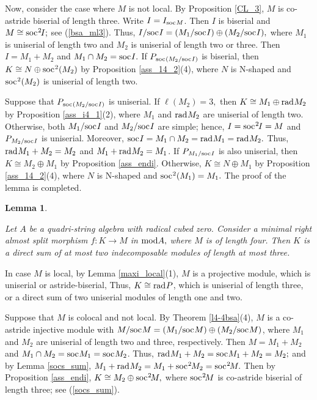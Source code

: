 \documentclass[10pt]{amsart}
\newtheorem{Lemma}[Theo]{Lemma}
\theoremstyle{definition}
\newcommand{\mmod}{{\rm mod}}
\newcommand{\rad}{{\rm rad}\hspace{.5pt}}
\newcommand{\soc}{{\rm soc}\hspace{.5pt}}
\newcommand{\hp}{\hspace{.5pt}}
\newcommand{\vp}{\vspace{.5pt}}
\begin{document}
Now, consider the case where $M$ is not local. By Proposition \ref{CL_3}, $M$ is co-astride biserial of length three. Write $I=I_{\soc M}$. Then $I$ is biserial and $M\cong \soc^2 \hspace{-1.2pt} I;$ see (\ref{bsa_ml3}). Thus, $I/ \soc I= (M_1/\soc I) \oplus (M_2/\soc I),$ where $M_1$ is uniserial of length two and $M_2$ is uniserial of length two or three. Then $I=M_1+M_2$ and $M_1\cap M_2=\soc I.$
If $P_{\hp \soc (M_2/\soc I)}$ is biserial, then
$K\cong N\oplus \soc^2(M_2)$ by Proposition \ref{ass_14_2}(4), where $N$ is N-shaped and $\soc^2(M_2)$ is uniserial of length two. 

Suppose that $P_{\hp \soc(M_2/\soc I)}$ is uniserial. If $\ell(M_2)=3,$ then $K\cong M_1 \oplus \rad  M_2$ by Proposition \ref{ass_i4_1}(2), where $M_1$ and $\rad M_2$ are uniserial of length two. Otherwise, both $M_1/\soc I$ and $M_2/\soc I$ are simple; hence, $I=\soc^2\hspace{-1pt}I=M$ and $P_{\hp M_2/\soc I}$ is uniserial. Moreover, $\soc I=M_1\cap M_2=\rad M_1=\rad M_2.$ Thus, $\rad M_1+M_2=M_2$ and $M_1+\rad M_2=M_1$. If $P_{\hp M_1/\soc I}$ is also uniserial, \vp then $K\cong M_2\oplus M_1$ by Proposition \ref{ass_endi}. 
Otherwise, $K\cong N\oplus M_1$ by Proposition \ref{ass_14_2}(4), where $N$ is N-shaped
and $\soc^2(M_1)=M_1.$ The proof of the lemma is completed.


\vspace{2pt}

\begin{Lemma}\label{4sa_rasm_l4}

Let $A$ be a quadri-string algebra with radical cubed zero. Consider a minimal right almost split morphism $f: K\to M$ in $\mmod A,$ where $M$ is of length four. Then $K$ is a direct sum of at most two indecomposable modules of length at most three.

\end{Lemma}

\vspace{-1.5pt}

 In case $M$ is local, by Lemma \ref{maxi_local}(1), $M$ is a projective module, which is uniserial or astride-biserial, Thus, $K\cong \rad P$, which is uniserial of length three, or a direct sum of two uniserial modules of length one and two. 

Suppose that $M$ is colocal and not local. By Theorem \ref{l4-4bsa}(4), $M$ is a co-astride injective module with $M/\soc M=(M_1/\soc M)\oplus(M_2/\soc M)$, where $M_1$ and $M_2$ are uniserial of length two and three, respectively. Then  $M=M_1+M_2$ and $M_1\cap M_2=\soc M_1=\soc M_2$. Thus, $\rad M_1+ M_2=\soc M_1+M_2=M_2;$ and by Lemma \ref{socs_sum}, $M_1+\rad M_2=M_1+\soc^2\hspace{-.8pt} M_2=\soc^2\hspace{-1.2pt}M.$ Then by Proposition \ref{ass_endi}, $K\cong M_2\oplus \soc^2\hspace{-1.5pt}M,$ where $\soc^2\hspace{-1.5pt}M$ is co-astride biserial of length three; see (\ref{socs_sum}).
\end{document}
